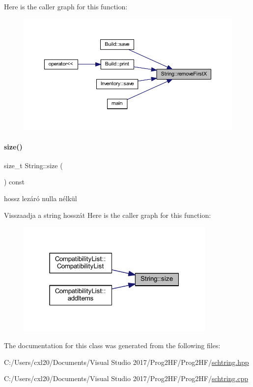 Here is the caller graph for this function\+:
\nopagebreak
\begin{figure}[H]
\begin{center}
\leavevmode
\includegraphics[width=350pt]{class_string_a15c07ede44c5bcfb0920e9bf63e75670_icgraph}
\end{center}
\end{figure}
\mbox{\label{class_string_a588c5cc9faededbb9d938662d354feed}} 
\paragraph{\texorpdfstring{size()}{size()}}
{\footnotesize\ttfamily size\+\_\+t String\+::size (\begin{DoxyParamCaption}{ }\end{DoxyParamCaption}) const\hspace{0.3cm}{\ttfamily [inline]}}



hossz lezáró nulla nélkül 

Visszaadja a string hosszát Here is the caller graph for this function\+:
\nopagebreak
\begin{figure}[H]
\begin{center}
\leavevmode
\includegraphics[width=277pt]{class_string_a588c5cc9faededbb9d938662d354feed_icgraph}
\end{center}
\end{figure}


The documentation for this class was generated from the following files\+:\begin{DoxyCompactItemize}
\item 
C\+:/\+Users/cxl20/\+Documents/\+Visual Studio 2017/\+Prog2\+H\+F/\+Prog2\+H\+F/\mbox{\hyperlink{schtring_8hpp}{schtring.\+hpp}}\item 
C\+:/\+Users/cxl20/\+Documents/\+Visual Studio 2017/\+Prog2\+H\+F/\+Prog2\+H\+F/\mbox{\hyperlink{schtring_8cpp}{schtring.\+cpp}}\end{DoxyCompactItemize}
